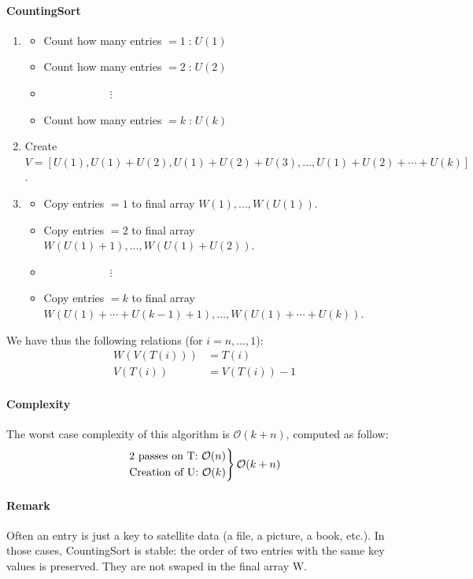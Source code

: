 \documentclass[11pt,a4paper]{article}
\begin{document}
\paragraph*{CountingSort}\begin{enumerate}
\item \begin{itemize} 
	\item Count how many entries $=1 \;$:$\; U(1)$
	\item Count how many entries $=2 \;$:$\; U(2)$
	\item $\qquad \qquad \qquad \vdots$
	\item Count how many entries $=k \;$:$\; U(k)$
	\end{itemize}
\item Create $V = \left[ U(1), U(1)+U(2), U(1)+U(2)+U(3), ..., U(1)+U(2)+\cdots+U(k) \right]$.
\item \begin{itemize} 
	\item Copy entries $=1$ to final array $W(1),...,W(U(1))$.
	\item Copy entries $=2$ to final array $W(U(1)+1),...,W(U(1)+U(2))$.
	\item $\qquad \qquad \qquad \vdots$
	\item Copy entries $=k$ to final array $W(U(1)+\cdots+U(k-1)+1),...,W(U(1)+\cdots+U(k))$.
	\end{itemize}
\end{enumerate}
We have thus the following relations (for $i=n,...,1$):
\begin{align*}
W(V(T(i))) & = T(i) \\
V(T(i)) & = V(T(i)) - 1
\end{align*}

\paragraph*{Complexity} The worst case complexity of this algorithm is $\mathcal{O}(k+n)$, computed as follow:
\[ 
\begin{rcases*}
\text{2 passes on T: } \mathcal{O}(n) \\
\text{Creation of U: } \mathcal{O}(k)
\end{rcases*} \mathcal{O}(k+n)
\]
\paragraph*{Remark} Often an entry is just a key to satellite data (a file, a picture, a book, etc.). In those cases, CountingSort is stable: the order of two entries with the same key values is preserved. They are not swaped in the final array W.
\end{document}
